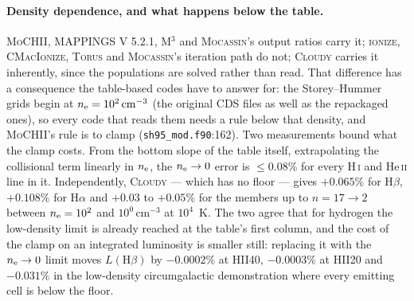 \documentclass[english,a4paper]{my_memo}
\newcommand{\code}[1]{\texttt{#1}}
\newcommand{\MoCHII}{\textsc{MoCHII}}
\newcommand{\Mthree}{M$^3$}
\newcommand{\Mappings}{MAPPINGS V 5.2.1}
\newcommand{\Wood}{\textsc{ionize}}
\newcommand{\CMI}{\textsc{CMacIonize}}
\newcommand{\Torus}{\textsc{Torus}}
\newcommand{\Mocassin}{\textsc{Mocassin}}
\newcommand{\Cloudy}{\textsc{Cloudy}}
\newcommand{\nelec}{n_{\rm e}}
\begin{document}
\paragraph{Density dependence, and what happens below the table.}
\MoCHII{}, \Mappings{}, \Mthree{} and \Mocassin{}'s output ratios carry it;
\Wood{}, \CMI{}, \Torus{} and \Mocassin{}'s iteration path do not;
\Cloudy{} carries it inherently, since the populations are solved rather than
read.  That difference has a consequence the table-based codes have to answer
for: the Storey--Hummer grids begin at
$\nelec = 10^{2}\,\mathrm{cm^{-3}}$ (the original CDS files as well as the
repackaged ones), so every code that reads them needs a rule below that
density, and \MoCHII{}'s rule is to clamp
(\code{sh95\_mod.f90}:162).  Two measurements bound what the clamp costs.
From the bottom slope of the table itself, extrapolating the collisional term
linearly in $\nelec$, the $\nelec \rightarrow 0$ error is $\le 0.08\%$ for
every H\,\textsc{i} and He\,\textsc{ii} line in it.  Independently,
\Cloudy{} --- which has no floor --- gives $+0.065\%$ for H$\beta$,
$+0.108\%$ for H$\alpha$ and $+0.03$ to $+0.05\%$ for the members up to
$n = 17 \rightarrow 2$ between $\nelec = 10^{2}$ and $10^{0}\,
\mathrm{cm^{-3}}$ at $10^{4}$~K.  The two agree that for hydrogen the
low-density limit is already reached at the table's first column, and the cost
of the clamp on an integrated luminosity is smaller still: replacing it with
the $\nelec \rightarrow 0$ limit moves $L(\mathrm{H}\beta)$ by $-0.0002\%$
at HII40, $-0.0003\%$ at HII20 and $-0.031\%$ in the low-density
circumgalactic demonstration where every emitting cell is below the floor.
\end{document}

